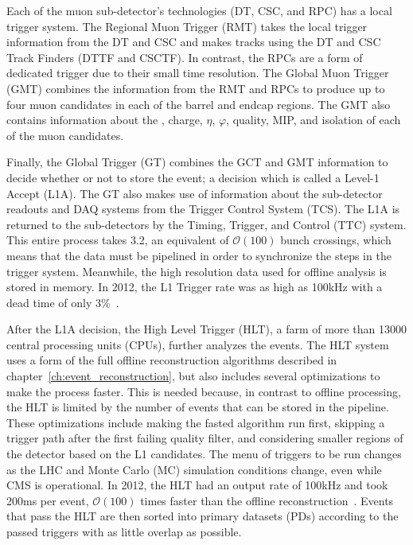 Each of the muon sub-detector's technologies (DT, CSC, and RPC) has a local trigger system.
The Regional Muon Trigger (RMT) takes the local trigger information from the DT and CSC and makes tracks using the DT and CSC Track Finders (DTTF and CSCTF).
In contrast, the RPCs are a form of dedicated trigger due to their small time resolution.
The Global Muon Trigger (GMT) combines the information from the RMT and RPCs to produce up to four muon candidates in each of the barrel and endcap regions.
The GMT also contains information about the \pt, charge, $\eta$, $\varphi$, quality, MIP, and isolation of each of the muon candidates.

Finally, the Global Trigger (GT) combines the GCT and GMT information to decide whether or not to store the event; a decision which is called a Level-1 Accept (L1A).
The GT also makes use of information about the sub-detector readouts and DAQ systems from the Trigger Control System (TCS). The L1A is returned to the sub-detectors by the Timing, Trigger, and Control (TTC) system.
This entire process takes 3.2\mus, an equivalent of $\mathcal{O}(100)$ bunch crossings, which means that the data must be pipelined in order to synchronize the steps in the trigger system.
Meanwhile, the high resolution data used for offline analysis is stored in memory. In 2012, the L1 Trigger rate was as high as 100\unit{kHz} with a dead time of only 3\%~\cite{Brooke:2013hnf}.

After the L1A decision, the High Level Trigger (HLT), a farm of more than 13000 central processing units (CPUs), further analyzes the events. The HLT 
system uses a form of the full offline reconstruction algorithms described in chapter~\ref{ch:event_reconstruction}, but also includes several optimizations to make the process faster. This is needed because, in contrast to offline processing, the HLT is limited by the number of events that can be stored in the pipeline. These optimizations include making the fasted algorithm run first, skipping a trigger path after the first failing quality filter, and considering smaller regions of the detector based on the L1 candidates. The menu of triggers to be run changes as the LHC and Monte Carlo (MC) simulation conditions change, even while CMS is operational. In 2012, the HLT had an output rate of 100\unit{kHz} and took 200\unit{ms} per event, $\mathcal{O}(100)$ times faster than the offline reconstruction~\cite{Trocino:2014jya}. Events that pass the HLT are then sorted into primary datasets (PDs) according to the passed triggers with as little overlap as possible.

